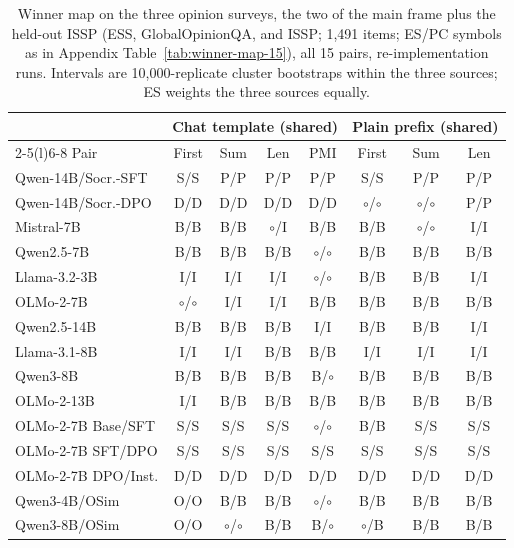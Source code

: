 \begin{table}[t]
\centering\scriptsize
\setlength{\tabcolsep}{2.2pt}
\begin{tabular}{@{}lcccc@{\hspace{4pt}}ccc@{}}
\toprule
& \multicolumn{4}{c}{Chat template (shared)} & \multicolumn{3}{c}{Plain prefix (shared)} \\
\cmidrule(lr){2-5}\cmidrule(l){6-8}
Pair & First & Sum & Len & PMI & First & Sum & Len \\
\midrule
Qwen-14B/Socr.-SFT & S/S & P/P & P/P & P/P & S/S & P/P & P/P \\
Qwen-14B/Socr.-DPO & D/D & D/D & D/D & D/D & $\circ$/$\circ$ & $\circ$/$\circ$ & P/P \\
Mistral-7B & B/B & B/B & $\circ$/I & B/B & B/B & $\circ$/$\circ$ & I/I \\
Qwen2.5-7B & B/B & B/B & B/B & $\circ$/$\circ$ & B/B & B/B & B/B \\
Llama-3.2-3B & I/I & I/I & I/I & $\circ$/$\circ$ & B/B & B/B & I/I \\
OLMo-2-7B & $\circ$/$\circ$ & I/I & I/I & B/B & B/B & B/B & B/B \\
Qwen2.5-14B & B/B & B/B & B/B & I/I & B/B & B/B & I/I \\
Llama-3.1-8B & I/I & I/I & B/B & B/B & I/I & I/I & I/I \\
Qwen3-8B & B/B & B/B & B/B & B/$\circ$ & B/B & B/B & B/B \\
OLMo-2-13B & I/I & B/B & B/B & B/B & B/B & B/B & B/B \\
OLMo-2-7B Base/SFT & S/S & S/S & S/S & $\circ$/$\circ$ & B/B & S/S & S/S \\
OLMo-2-7B SFT/DPO & S/S & S/S & S/S & S/S & S/S & S/S & S/S \\
OLMo-2-7B DPO/Inst. & D/D & D/D & D/D & D/D & D/D & D/D & D/D \\
Qwen3-4B/OSim & O/O & B/B & B/B & $\circ$/$\circ$ & B/B & B/B & B/B \\
Qwen3-8B/OSim & O/O & $\circ$/$\circ$ & B/B & B/$\circ$ & $\circ$/B & B/B & B/B \\
\bottomrule
\end{tabular}
\caption{Winner map on the three opinion surveys, the two of the main frame plus the held-out ISSP (ESS, GlobalOpinionQA, and ISSP; 1,491 items; ES/PC symbols as in Appendix Table~\ref{tab:winner-map-15}), all 15 pairs, re-implementation runs. Intervals are 10,000-replicate cluster bootstraps within the three sources; ES weights the three sources equally.}
\label{tab:opinion-issp}
\end{table}
